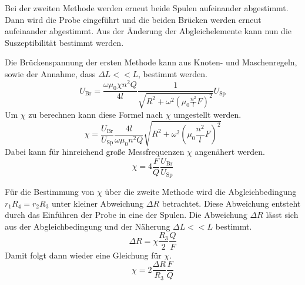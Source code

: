 Bei der zweiten Methode werden erneut beide Spulen aufeinander abgestimmt. Dann wird die Probe eingeführt und die beiden Brücken werden erneut aufeinander abgestimmt. Aus der
Änderung der Abgleichelemente kann nun die Suszeptibilität bestimmt werden.

Die Brückenspannung der ersten Methode kann aus Knoten- und Maschenregeln, sowie der Annahme, dass $\Delta L << L$, bestimmt werden. 
\begin{equation*}
    U_{\text{Br}} = \frac{\omega\mu_0\chi n^2Q}{4l}\frac{1}{\sqrt{R^2 + \omega^2\left(\mu_0\frac{n^2}{l}F\right)^2}}U_{\text{Sp}}
\end{equation*}
Um $\chi$ zu berechnen kann diese Formel nach $\chi$ umgestellt werden.
\begin{equation}
    \label{eqn:chi_theo}
    \chi = \frac{U_{\text{Br}}}{U_{\text{Sp}}}\frac{4l}{\omega\mu_0n^2Q}\sqrt{R^2 + \omega^2\left(\mu_0\frac{n^2}{l}F\right)^2}
\end{equation}
Dabei kann für hinreichend große Messfrequenzen $\chi$ angenähert werden.
\begin{equation}
    \label{eqn:chi:näherung}
    \chi = 4 \frac{F}{Q}\frac{U_{\text{Br}}}{U_{\text{Sp}}}
\end{equation}


Für die Bestimmung von $\chi$ über die zweite Methode wird die Abgleichbedingung $r_1R_4 = r_2R_3$ unter kleiner Abweichung $\Delta R$ betrachtet. Diese Abweichung entsteht
durch das Einführen der Probe in eine der Spulen. Die Abweichung $\Delta R$ lässt sich aus der Abgleichbedingung und der Näherung $\Delta L << L$ bestimmt.
\begin{equation*}
    \Delta R = \chi\frac{R_3}{2}\frac{Q}{F}
\end{equation*}
Damit folgt dann wieder eine Gleichung für $\chi$.
\begin{equation}
    \label{eqn:chimethode2}
    \chi = 2\frac{\Delta R}{R_3}\frac{F}{Q}
\end{equation}

